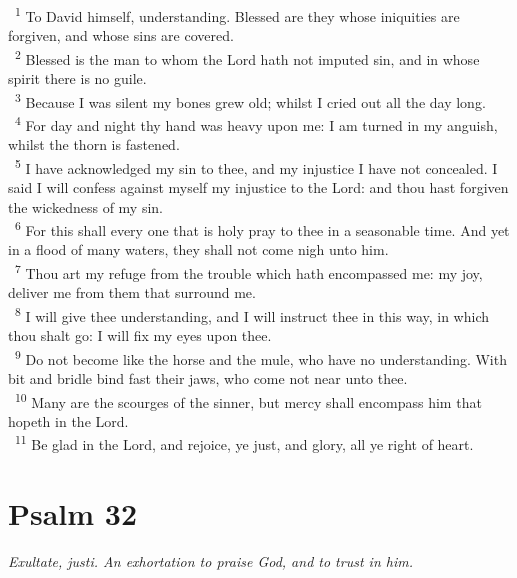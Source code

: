 \documentclass[a5paper,12pt]{article}
\begin{document}
\begin{multicols*}{2}
~\textsuperscript{1} To David himself, understanding. Blessed are they whose iniquities are forgiven, and whose sins are covered.\\
~\textsuperscript{2} Blessed is the man to whom the Lord hath not imputed sin, and in whose spirit there is no guile.\\
~\textsuperscript{3} Because I was silent my bones grew old; whilst I cried out all the day long.\\
~\textsuperscript{4} For day and night thy hand was heavy upon me: I am turned in my anguish, whilst the thorn is fastened.\\
~\textsuperscript{5} I have acknowledged my sin to thee, and my injustice I have not concealed. I said I will confess against myself my injustice to the Lord: and thou hast forgiven the wickedness of my sin.\\
~\textsuperscript{6} For this shall every one that is holy pray to thee in a seasonable time. And yet in a flood of many waters, they shall not come nigh unto him.\\
~\textsuperscript{7} Thou art my refuge from the trouble which hath encompassed me: my joy, deliver me from them that surround me.\\
~\textsuperscript{8} I will give thee understanding, and I will instruct thee in this way, in which thou shalt go: I will fix my eyes upon thee.\\
~\textsuperscript{9} Do not become like the horse and the mule, who have no understanding. With bit and bridle bind fast their jaws, who come not near unto thee.\\
~\textsuperscript{10} Many are the scourges of the sinner, but mercy shall encompass him that hopeth in the Lord.\\
~\textsuperscript{11} Be glad in the Lord, and rejoice, ye just, and glory, all ye right of heart.\\

\section{Psalm 32}
\label{sec:org6a3cfb6}
\emph{Exultate, justi. An exhortation to praise God, and to trust in him.}\\


\end{multicols*}
\end{document}
